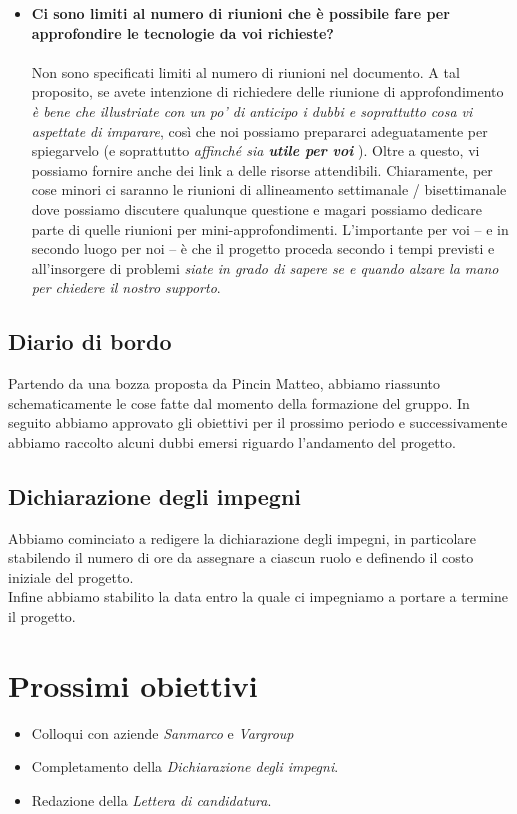 \begin{itemize}
        \item \textbf{Ci sono limiti al numero di riunioni che è possibile fare per approfondire le tecnologie da voi richieste?} \\\\
        Non sono specificati limiti al numero di riunioni nel documento. A tal proposito, se avete intenzione di richiedere delle riunione di approfondimento \textit{è bene che illustriate con un po' di anticipo i dubbi e soprattutto cosa vi aspettate di imparare}, così che noi possiamo prepararci adeguatamente per spiegarvelo (e soprattutto \textit{affinché sia \textbf{utile per voi} }). Oltre a questo, vi possiamo fornire anche dei link a delle risorse attendibili. Chiaramente, per cose minori ci saranno le riunioni di allineamento settimanale / bisettimanale dove possiamo discutere qualunque questione e magari possiamo dedicare parte di quelle riunioni per mini-approfondimenti. L'importante per voi – e in secondo luogo per noi – è che il progetto proceda secondo i tempi previsti e all'insorgere di problemi \textit{siate in grado di sapere se e quando alzare la mano per chiedere il nostro supporto}.
    \end{itemize}
    \subsection{Diario di bordo}
    Partendo da una bozza proposta da Pincin Matteo, abbiamo riassunto schematicamente le cose fatte dal momento della formazione del gruppo. In seguito abbiamo approvato gli obiettivi per il prossimo periodo e successivamente abbiamo raccolto alcuni dubbi emersi riguardo l'andamento del progetto.
    \subsection{Dichiarazione degli impegni}
    Abbiamo cominciato a redigere la dichiarazione degli impegni, in particolare stabilendo il numero di ore da assegnare a ciascun ruolo e definendo il costo iniziale del progetto. \\Infine abbiamo stabilito la data entro la quale ci impegniamo a portare a termine il progetto.
\section{Prossimi obiettivi}
   \begin{itemize}
        \item Colloqui con aziende \textit{Sanmarco} e \textit{Vargroup}
        \item Completamento della \textit{Dichiarazione degli impegni}.
        \item Redazione della \textit{Lettera di candidatura}.
    \end{itemize}